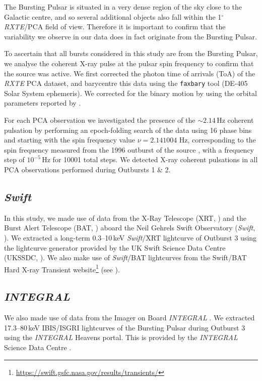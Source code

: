 \par The Bursting Pulsar is situated in a very dense region of the sky close to the Galactic centre, and so several additional objects also fall within the 1$^\circ$ \textit{RXTE}/PCA field of view.  Therefore it is important to confirm that the variability we observe in our data does in fact originate from the Bursting Pulsar.
\par To ascertain that all bursts considered in this study are from the Bursting Pulsar, we analyse the coherent X-ray pulse at the pulsar spin frequency to confirm that the source was active.  We first corrected the photon time of arrivals (ToA) of the \textit{RXTE} PCA dataset, and barycentre this data using the \texttt{faxbary} tool (DE-405 Solar System ephemeris).  We corrected for the binary motion by using the orbital parameters reported by \citet{Finger_Pulse}.
\par For each PCA observation we investigated the presence of the $\sim 2.14$\,Hz coherent pulsation by performing an epoch-folding search of the data using 16 phase bins and starting with the spin frequency value $\nu=2.141004$ Hz, corresponding to the spin frequency measured from the 1996 outburst of the source \citep{Finger_Pulse}, with a frequency step of $10^{-5}$\,Hz for 10001 total steps. We detected X-ray coherent pulsations in all PCA observations performed during Outbursts 1 \& 2.

\subsection{\textit{Swift}}
\par In this study, we made use of data from the X-Ray Telescope (XRT, \citealp{Burrows_XRT}) and the Burst Alert Telescope (BAT, \citealp{Krimm_BAT}) aboard the Neil Gehrels Swift Observatory (\textit{Swift}, \citealp{Gehrels_Swift}).  We extracted a long-term 0.3--10\,keV \textit{Swift}/XRT lightcurve of Outburst 3 using the lightcurve generator provided by the UK Swift Science Data Centre (UKSSDC, \citealp{Evans_Swift1}).  We also make use of \textit{Swift}/BAT lightcurves from the Swift/BAT Hard X-ray Transient website\footnote{\url{https://swift.gsfc.nasa.gov/results/transients/}} (see \citealp{Krimm_BAT}).

\subsection{\textit{INTEGRAL}}

\par We also made use of data from the Imager on Board \textit{INTEGRAL} \citep{Winkler_IBIS}.  We extracted 17.3--80\,keV IBIS/ISGRI lightcurves of the Bursting Pulsar during Outburst 3 using the \textit{INTEGRAL} Heavens portal.  This is provided by the \textit{INTEGRAL} Science Data Centre \citep{Lubinski_Heavens}.


